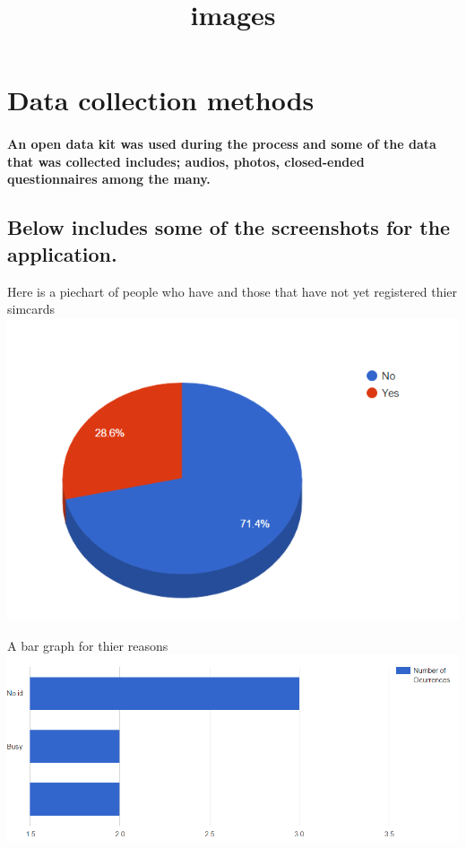 \documentclass[12pt]{report}
\begin{document}
\section{Data collection methods}
\paragraph{An open data kit was used during the process and some of the data that was collected includes; audios, photos, closed-ended questionnaires among the many.}

\subsection{Below includes some of the screenshots for the application.}
\title{images}
\maketitle
Here is a piechart of people who have and those that have not yet registered thier simcards
\includegraphics{capture.png}

A bar graph for thier reasons
\includegraphics{graph}
\end{document}
